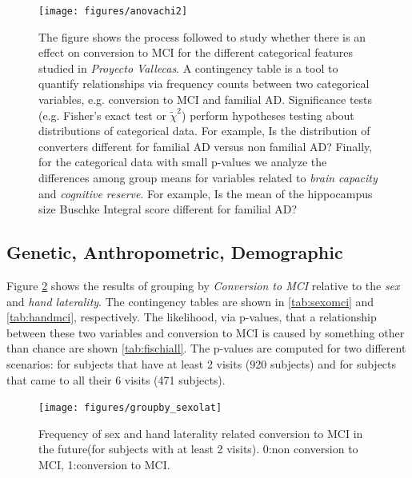 \documentclass[11pt]{article}
\theoremstyle{definition}
\theoremstyle{remark}
\begin{document}
\begin{figure}[!htb]
        \centering
        \texttt{[image: figures/anovachi2]}
        \caption{The figure shows the process followed to study whether there is an effect on conversion to MCI for the different categorical features studied in \emph{Proyecto Vallecas}. A contingency table is a tool to quantify relationships via frequency counts between two categorical variables, e.g. conversion to MCI and familial AD. Significance tests (e.g. Fisher's exact test \cite{fisher1937design}or $\tilde{\chi}^2$) perform hypotheses testing about distributions of categorical data. For example, Is the distribution of converters different for familial AD versus non familial AD? Finally, for the categorical data with small p-values we analyze the differences among group means for variables related to \emph{brain capacity} and \emph{cognitive reserve}. For example, Is the mean of the hippocampus size Buschke Integral score different for familial AD?
        } 
        \label{fig:anovachi}
\end{figure}


\subsection{Genetic, Anthropometric, Demographic}


Figure \ref{fig:groupby_sexolat} shows the results of grouping by \emph{Conversion to MCI} relative to the \emph{sex} and \emph{hand laterality}. The contingency tables are shown in \ref{tab:sexomci} and \ref{tab:handmci}, respectively.
The likelihood, via p-values, that a relationship between these two variables and conversion to MCI is caused by something other than chance are shown \ref{tab:fischiall}. The p-values are computed for two different scenarios: for subjects that have at least 2 visits (920 subjects) and for subjects that came to all their 6 visits (471 subjects).

\begin{figure}[!htb]
        \centering
        \texttt{[image: figures/groupby\_sexolat]}
        \caption{Frequency of sex and hand laterality related conversion to MCI in the future(for subjects with at least 2 visits). 0:non conversion to MCI, 1:conversion to MCI.} 
        \label{fig:groupby_sexolat}
\end{figure}
\end{document}
